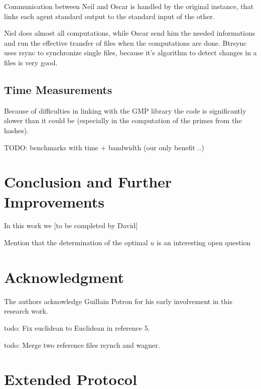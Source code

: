 \documentclass[11pt]{llncs}
\begin{document}
Communication between Neil and Oscar is handled by the original instance, that
links each agent standard output to the standard input of the other.

Niel does almost all computations, while Oscar send him the needed
informations and run the effective transfer of files when the
computations are done. Btrsync uses rsync to synchronize single files,
because it's algorithm to detect changes in a files is very good.

\subsection{Time Measurements}

Because of difficulties in linking with the GMP library the code is 
significantly slower than it could be (especially in the computation of the
primes from the hashes).

TODO: benchmarks with time + bandwidth (our only benefit ..)

\section{Conclusion and Further Improvements}

In this work we [to be completed by David]\smallskip

Mention that the determination of the optimal $u$ is an interesting open question

\section{Acknowledgment}

The authors acknowledge Guillain Potron for his early involvement in this research work.\smallskip

todo: Fix euclidean to Euclidean in reference 5.\smallskip

todo: Merge two reference files rsynch and wagner.\smallskip
\nocite{rsync}
\nocite{wagner}




\appendix

\section{Extended Protocol}
\end{document}
